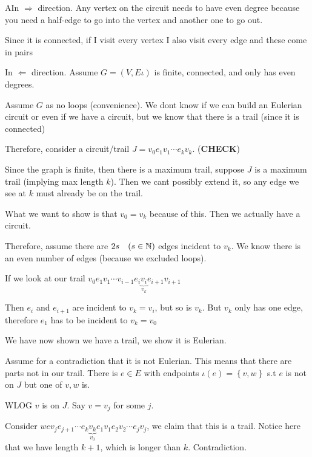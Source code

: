 \begin{prf}
  AIn $\Rightarrow$ direction. Any vertex on the circuit needs to have even degree because you need a half-edge to go into the vertex and another one to go out.\par
  \noindent Since it is connected, if I visit every vertex I also visit every edge and these come in pairs
  \par\bigskip
  \noindent In $\Leftarrow$ direction. Assume $G = (V,E\iota)$ is finite, connected, and only has even degrees.\par
  \noindent Assume $G$ as no loops (convenience). We dont know if we can build an Eulerian circuit or even if we have a circuit, but we know that there is a trail (since it is connected)\par
  \noindent Therefore, consider a circuit/trail $J = v_0e_1v_1\cdots e_kv_k$. (\textbf{CHECK})\par
  \noindent Since the graph is finite, then there is a maximum trail, suppose $J$ is a maximum trail (implying max length $k$). Then we cant possibly extend it, so any edge we see at $k$ must already be on the trail.\par
  \noindent What we want to show is that $v_0=v_k$ because of this. Then we actually have a circuit.\par
  \noindent Therefore, assume there are $2s\quad (s\in\mathbb{N})$ edges incident to $v_k$. We know there is an even number of edges (because we excluded loops).\par
  \noindent If we look at our trail $v_0e_1v_1\cdots v_{i-1}e_i\underbrace{v_i}_{\text{$v_k$}}e_{i+1}v_{i+1}$\par
  \noindent Then $e_i$ and $e_{i+1}$ are incident to $v_k=v_i$, but so is $v_k$. But $v_k$ only has one edge, therefore $e_1$ has to be incident to $v_k=v_0$\par
  \noindent We have now shown we have a trail, we show it is Eulerian.\par
  \noindent Assume for a contradiction that it is not Eulerian. This means that there are parts not in our trail. There is $e\in E$ with endpoints $\iota(e) = \left\{v,w\right\}$ s.t $e$ is not on $J$ but one of $v,w$ is.\par
  \noindent WLOG $v$ is on $J$. Say $v = v_j$ for some $j$.\par
  \noindent Consider $wev_je_{j+1}\cdots e_k\underbrace{v_k}_{\text{$v_0$}}e_1v_1e_2v_2\cdots e_jv_j$, we claim that this is a trail. Notice here that we have length $k+1$, which is longer than $k$. Contradiction.
\end{prf}

